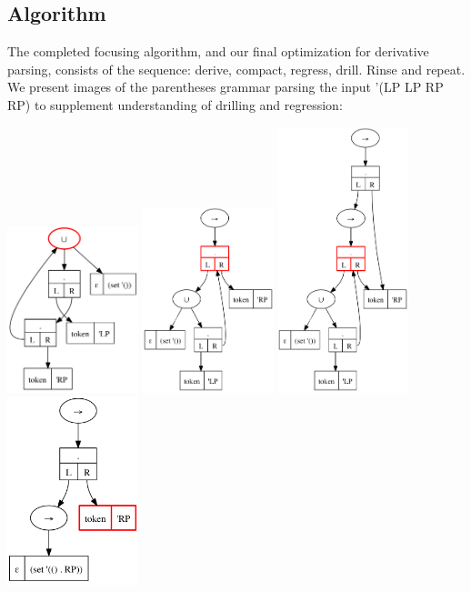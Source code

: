 \subsection{Algorithm}
The completed focusing algorithm, and our final optimization for derivative
parsing, consists of the sequence: derive, compact, regress, drill.
%
Rinse and repeat.
%
We present images of the parentheses grammar parsing the input '(LP LP RP RP)
to supplement understanding of drilling and regression:
%
\begin{center}
 \includegraphics[width=1.5in]{parens-short-step-0-f.png}
 \includegraphics[width=1.5in]{parens-short-step-1-f.png}
 \includegraphics[width=1.5in]{parens-short-step-2-f.png}
 \includegraphics[width=1.5in]{parens-short-step-3-f.png}

\end{center}
